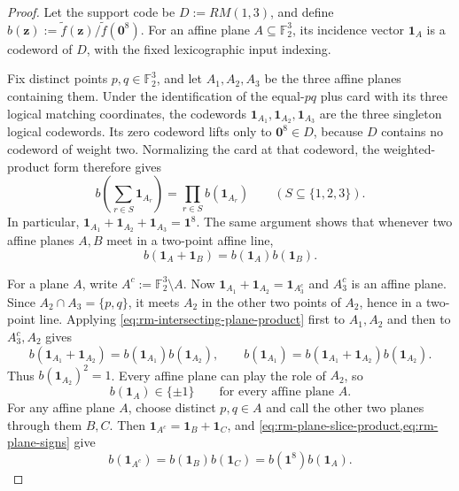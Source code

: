 \documentclass[11pt,letterpaper,onecolumn]{article}
\theoremstyle{plain}
\theoremstyle{definition}
\theoremstyle{remark}
\newcommand{\Ftwo}{\mathbb F_2}
\newcommand{\one}{\mathbf 1}
\newcommand{\zero}{\mathbf 0}
\begin{document}
\begin{proof}
Let the support code be \(D:=RM(1,3)\), and define
\(b({\mathbf{z}}):=\widetilde f({\mathbf{z}})/\widetilde f(\zero^8)\).  For an affine plane
\(A\subseteq\Ftwo^3\), its incidence vector \(\one_A\) is a codeword
of \(D\), with the fixed lexicographic input indexing.

Fix distinct points \(p,q\in\Ftwo^3\), and let
\(A_1,A_2,A_3\) be the three affine planes containing them.  Under the
identification of the equal-\(pq\) plus card with its three logical
matching coordinates, the codewords \(\one_{A_1},\one_{A_2},\one_{A_3}\) are the three singleton
logical codewords.  Its zero codeword lifts only to \(\zero^8\in D\), because \(D\)
contains no codeword of weight two.  Normalizing the card at that codeword, the
weighted-product form therefore gives
\begin{equation}
 b\left(\sum_{r\in S}\one_{A_r}\right)
   =\prod_{r\in S}b(\one_{A_r})
 \qquad\left(S\subseteq\{1,2,3\}\right).
 \label{eq:rm-plane-slice-product}
\end{equation}
In particular, \(\one_{A_1}+\one_{A_2}+\one_{A_3}=\one^8\).  The same argument shows that
whenever two affine planes \(A,B\) meet in a two-point affine line,
\begin{equation}
 b(\one_A+\one_B)=b(\one_{A})b(\one_{B}).
 \label{eq:rm-intersecting-plane-product}
\end{equation}

For a plane \(A\), write \(A^c:=\Ftwo^3\setminus A\).  Now
\(\one_{A_1}+\one_{A_2}=\one_{A_3^c}\) and \(A_3^c\) is an affine plane.  Since
\(A_2\cap A_3=\{p,q\}\), it meets \(A_2\) in the other two points of
\(A_2\), hence in a two-point line.  Applying
\cref{eq:rm-intersecting-plane-product} first to \(A_1,A_2\) and then to
\(A_3^c,A_2\) gives
\[
 b(\one_{A_1}+\one_{A_2})=b(\one_{A_1})b(\one_{A_2}),
 \qquad
 b(\one_{A_1})=b(\one_{A_1}+\one_{A_2})b(\one_{A_2}).
\]
Thus \(b(\one_{A_2})^2=1\).  Every affine plane can play the role of \(A_2\), so
\begin{equation}
 b(\one_{A})\in\{\pm1\}
 \qquad\text{for every affine plane }A.
 \label{eq:rm-plane-signs}
\end{equation}
For any affine plane \(A\), choose distinct \(p,q\in A\) and call the other
two planes through them \(B,C\).  Then \(\one_{A^c}=\one_B+\one_C\), and
\cref{eq:rm-plane-slice-product,eq:rm-plane-signs} give
\begin{equation}
 b(\one_{A^c})=b(\one_{B})b(\one_{C})=b(\one^8)b(\one_{A}).
 \label{eq:rm-complement-plane-product}
\end{equation}


\end{proof}
\end{document}
